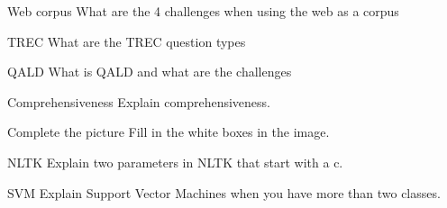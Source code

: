 \documentclass{article}
\begin{document}
\begin{exercise}{Web corpus}
  What are the 4 challenges when using the web as a corpus

  \begin{solution}
  \end{solution}
\end{exercise}

\begin{exercise}{TREC}
  What are the TREC question types

  \begin{solution}
  \end{solution}
\end{exercise}

\begin{exercise}{QALD}
  What is QALD and what are the challenges

  \begin{solution}
  \end{solution}
\end{exercise}


\setcounter{section}{2020}

\begin{exercise}{Comprehensiveness}
  Explain comprehensiveness.

  \begin{solution}
  \end{solution}
\end{exercise}

\begin{exercise}{Complete the picture}
  Fill in the white boxes in the image.


  \begin{solution}
  \end{solution}
\end{exercise}

\begin{exercise}{NLTK}
  Explain two parameters in NLTK that start with a c.

  \begin{solution}
  \end{solution}
\end{exercise}

\begin{exercise}{SVM}
  Explain Support Vector Machines when you have more than two classes.

  \begin{solution}
  \end{solution}
\end{exercise}
\end{document}
